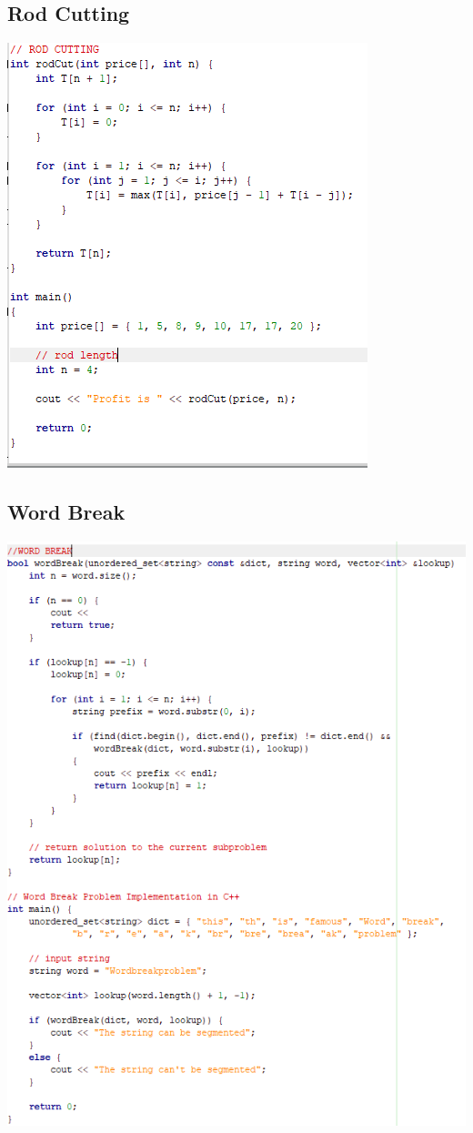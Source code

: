 \documentclass[11pt,twocolumn]{article}
\begin{document}
\subsection{Rod Cutting}

\includegraphics[scale=0.7]{rod}

\subsection{Word Break}

\includegraphics[scale=0.6]{wordbreak}
\end{document}
